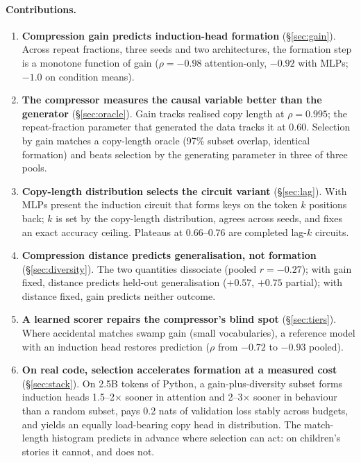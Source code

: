 \documentclass[11pt]{article}
\begin{document}
\paragraph{Contributions.}
\begin{enumerate}
\item \textbf{Compression gain predicts induction-head formation}
  (\S\ref{sec:gain}). Across repeat fractions, three seeds and two
  architectures, the formation step is a monotone function of gain
  ($\rho=-0.98$ attention-only, $-0.92$ with MLPs; $-1.0$ on condition
  means).
\item \textbf{The compressor measures the causal variable better than the
  generator} (\S\ref{sec:oracle}). Gain tracks realised copy length at
  $\rho=0.995$; the repeat-fraction parameter that generated the data
  tracks it at $0.60$. Selection by gain matches a copy-length oracle
  (97\% subset overlap, identical formation) and beats selection by the
  generating parameter in three of three pools.
\item \textbf{Copy-length distribution selects the circuit variant}
  (\S\ref{sec:lag}). With MLPs present the induction circuit that forms
  keys on the token $k$ positions back; $k$ is set by the copy-length
  distribution, agrees across seeds, and fixes an exact accuracy ceiling.
  Plateaus at 0.66--0.76 are completed lag-$k$ circuits.
\item \textbf{Compression distance predicts generalisation, not formation}
  (\S\ref{sec:diversity}). The two quantities dissociate (pooled
  $r=-0.27$); with gain fixed, distance predicts held-out generalisation
  ($+0.57$, $+0.75$ partial); with distance fixed, gain predicts neither
  outcome.
\item \textbf{A learned scorer repairs the compressor's blind spot}
  (\S\ref{sec:tiers}). Where accidental matches swamp gain (small
  vocabularies), a reference model with an induction head restores
  prediction ($\rho$ from $-0.72$ to $-0.93$ pooled).
\item \textbf{On real code, selection accelerates formation at a measured
  cost} (\S\ref{sec:stack}). On 2.5B tokens of Python, a gain-plus-diversity
  subset forms induction heads 1.5--2$\times$ sooner in attention and
  2--3$\times$ sooner in behaviour than a random subset, pays 0.2 nats of
  validation loss stably across budgets, and yields an equally load-bearing
  copy head in distribution. The match-length histogram predicts in advance
  where selection can act: on children's stories it cannot, and does not.
\end{enumerate}
\end{document}
